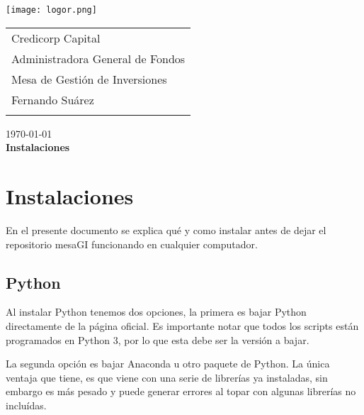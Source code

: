 \documentclass{article}
\begin{document}
\texttt{[image: logor.png]}
\vspace*{-1.55cm}

\hspace*{1.4 cm}
 \hspace*{2.9 cm}
 {\footnotesize
 \begin{tabular}{l}
  \sc Credicorp Capital\\
  \sc Administradora General de Fondos \\
  \sc Mesa de Gestión de Inversiones  \\
  \sc Fernando Suárez  \\
  \vspace{15\baselineskip}\mbox{}
  \vspace{-3mm}\mbox{}
 \end{tabular}
}

 \bigskip

\vspace*{5mm}
\begin{center}
{\today} \\
\vspace{3mm}
{\Large\bf Instalaciones} \\
\vspace{2mm}
\end{center}
\section{Instalaciones}


En el presente documento se explica qué y como instalar antes de dejar el repositorio mesaGI funcionando en cualquier computador.

\subsection{Python}

Al instalar Python tenemos dos opciones, la primera es bajar Python directamente de la página oficial. Es importante notar que todos los scripts están programados en Python 3, por lo que esta debe ser la versión a bajar. 

La segunda opción es bajar Anaconda u otro paquete de Python. La única ventaja que tiene, es que viene con una serie de librerías ya instaladas, sin embargo es más pesado y puede generar errores al topar con algunas librerías no incluídas.
\end{document}
